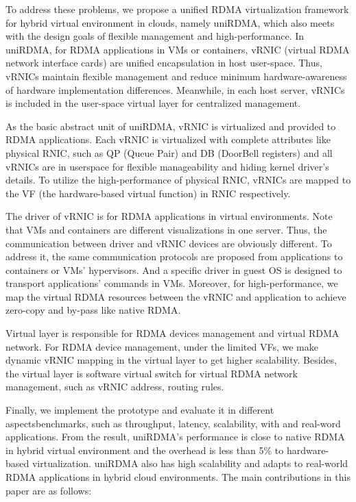 To address these problems, we propose a unified RDMA virtualization framework for hybrid virtual environment in clouds, namely uniRDMA, which also meets with the design goals of flexible management and high-performance. In uniRDMA, for RDMA applications in VMs or containers, vRNIC (virtual RDMA network interface cards) are unified encapsulation in host user-space. Thus, vRNICs maintain flexible management and reduce minimum hardware-awareness of hardware implementation differences. Meanwhile, in each host server, vRNICs is included in the user-space virtual layer for centralized management. 

As the basic abstract unit of uniRDMA, vRNIC is virtualized and provided to RDMA applications. Each vRNIC is virtualized with complete attributes like physical RNIC, such as QP (Queue Pair) and DB (DoorBell registers) and all vRNICs are in userspace for flexible manageability and hiding kernel driver’s details. To utilize the high-performance of physical RNIC, vRNICs are mapped to the VF (the hardware-based virtual function) in RNIC respectively.

The driver of vRNIC is for RDMA applications in virtual environments. Note that VMs and containers are different visualizations in one server. Thus, the communication between driver and vRNIC devices are obviously different. To address it, the same communication protocols are proposed from applications to containers or VMs’ hypervisors. And a specific driver in guest OS is designed to transport applications’ commands in VMs. Moreover, for high-performance, we map the virtual RDMA resources between the vRNIC and application to achieve zero-copy and by-pass like native RDMA.

Virtual layer is responsible for RDMA devices management and virtual RDMA network. For RDMA device management,  under the limited VFs, we make dynamic vRNIC mapping in the virtual layer to get higher scalability. Besides, the virtual layer is software virtual switch for virtual RDMA network management, such as vRNIC address, routing rules.

Finally, we implement the prototype and evaluate it in different aspectsbenchmarks, such as throughput, latency, scalability, with and real-word applications. From the result, uniRDMA’s performance is close to native RDMA in hybrid virtual environment and the overhead is less than 5\% to hardware-based virtualization. uniRDMA also has high scalability and adapts to real-world RDMA applications in hybrid cloud environments. The main contributions in this paper are as follows:

